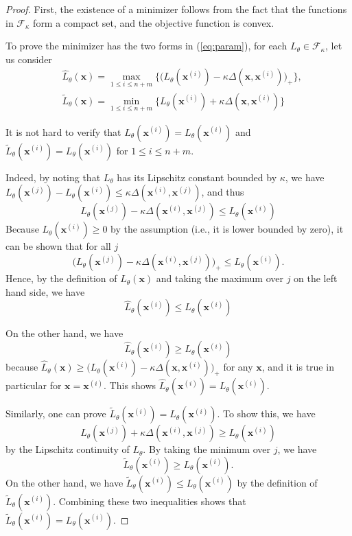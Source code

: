 \begin{proof}
First, the existence of a minimizer follows from the fact that the functions in $\mathcal F_\kappa$ form a compact set, and the objective function is convex.

To prove the minimizer has the two forms in (\ref{eq:param}), for each $L_\theta \in \mathcal F_\kappa$, let us consider
\[
\begin{aligned}
&\widehat L_{\theta}(\mathbf x) = \max_{1\leq i\leq n+m}\big\{\big(L_\theta(\mathbf x^{(i)})-\kappa\Delta(\mathbf x,\mathbf x^{(i)})\big)_+\big\},\\
&\widetilde L_{\theta}(\mathbf x) = \min_{1\leq i\leq n+m}\big\{L_\theta(\mathbf x^{(i)})+\kappa\Delta(\mathbf x,\mathbf x^{(i)})\}
\end{aligned}
\]

It is not hard to verify that $\widehat L_\theta(\mathbf x^{(i)})=L_\theta(\mathbf x^{(i)})$ and $\widetilde L_\theta(\mathbf x^{(i)})=L_\theta(\mathbf x^{(i)})$ for $1\leq i\leq n+m$.

Indeed, by noting that $L_{\theta}$ has its Lipschitz constant bounded by $\kappa$, we have $L_{\theta}(\mathbf x^{(j)})-L_{\theta}(\mathbf x^{(i)})\leq \kappa \Delta(\mathbf x^{(i)},\mathbf x^{(j)})$, and thus
$$L_{\theta}(\mathbf x^{(j)})-\kappa \Delta(\mathbf x^{(i)},\mathbf x^{(j)})\leq L_{\theta}(\mathbf x^{(i)})$$
Because $L_{\theta}(\mathbf x^{(i)})\geq 0$ by the assumption (i.e., it is lower bounded by zero), it can be shown that for all $j$
$$\big(L_{\theta}(\mathbf x^{(j)})-\kappa \Delta(\mathbf x^{(i)},\mathbf x^{(j)})\big)_+\leq L_{\theta}(\mathbf x^{(i)}).$$
Hence, by the definition of $\widehat L_{\theta}(\mathbf x)$ and taking the maximum over $j$ on the left hand side, we have
$$\widehat L_{\theta}(\mathbf x^{(i)})\leq L_{\theta}(\mathbf x^{(i)})$$

On the other hand,  we have
$$\widehat L_{\theta}(\mathbf x^{(i)}) \geq L_{\theta}(\mathbf x^{(i)})$$
because $\widehat L_{\theta}(\mathbf x) \geq \big(L_\theta(\mathbf x^{(i)})-\kappa\Delta(\mathbf x,\mathbf x^{(i)})\big)_+$ for any $\mathbf x$, and it is true in particular for $\mathbf x=\mathbf x^{(i)}$.  This shows $\widehat L_{\theta}(\mathbf x^{(i)}) = L_{\theta}(\mathbf x^{(i)})$.

Similarly, one can prove $\widetilde L_\theta(\mathbf x^{(i)})=L_\theta(\mathbf x^{(i)})$. To show this, we have
$$
L_\theta(\mathbf x^{(j)})+\kappa\Delta(\mathbf x^{(i)},\mathbf x^{(j)})\geq L_\theta(\mathbf x^{(i)})
$$
by the Lipschitz continuity of $L_\theta$. By taking the minimum over $j$, we have
$$
\widetilde L_\theta(\mathbf x^{(i)}) \geq L_\theta(\mathbf x^{(i)}).
$$
On the other hand, we have $\widetilde L_\theta(\mathbf x^{(i)})\leq L_\theta(\mathbf x^{(i)})$ by the definition of $\widetilde L_\theta(\mathbf x^{(i)})$.  Combining these two inequalities shows that $\widetilde L_\theta(\mathbf x^{(i)})=L_\theta(\mathbf x^{(i)})$.


\end{proof}
